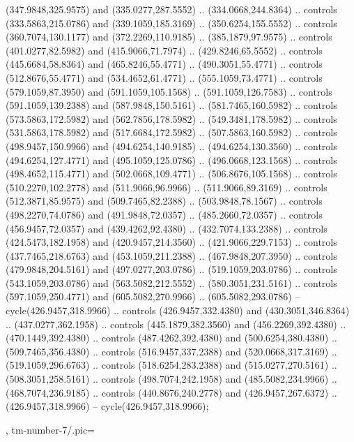 {{\begin{scope}[y=-0.80pt,x=0.80pt,scale=0.04,yshift=188pt,xshift=-380pt]
      (347.9848,325.9575) and (335.0277,287.5552) .. (334.0668,244.8364) .. controls
      (333.5863,215.0786) and (339.1059,185.3169) .. (350.6254,155.5552) .. controls
      (360.7074,130.1177) and (372.2269,110.9185) .. (385.1879,97.9575) .. controls
      (401.0277,82.5982) and (415.9066,71.7974) .. (429.8246,65.5552) .. controls
      (445.6684,58.8364) and (465.8246,55.4771) .. (490.3051,55.4771) .. controls
      (512.8676,55.4771) and (534.4652,61.4771) .. (555.1059,73.4771) .. controls
      (579.1059,87.3950) and (591.1059,105.1568) .. (591.1059,126.7583) .. controls
      (591.1059,139.2388) and (587.9848,150.5161) .. (581.7465,160.5982) .. controls
      (573.5863,172.5982) and (562.7856,178.5982) .. (549.3481,178.5982) .. controls
      (531.5863,178.5982) and (517.6684,172.5982) .. (507.5863,160.5982) .. controls
      (498.9457,150.9966) and (494.6254,140.9185) .. (494.6254,130.3560) .. controls
      (494.6254,127.4771) and (495.1059,125.0786) .. (496.0668,123.1568) .. controls
      (498.4652,115.4771) and (502.0668,109.4771) .. (506.8676,105.1568) .. controls
      (510.2270,102.2778) and (511.9066,96.9966) .. (511.9066,89.3169) .. controls
      (512.3871,85.9575) and (509.7465,82.2388) .. (503.9848,78.1567) .. controls
      (498.2270,74.0786) and (491.9848,72.0357) .. (485.2660,72.0357) .. controls
      (456.9457,72.0357) and (439.4262,92.4380) .. (432.7074,133.2388) .. controls
      (424.5473,182.1958) and (420.9457,214.3560) .. (421.9066,229.7153) .. controls
      (437.7465,218.6763) and (453.1059,211.2388) .. (467.9848,207.3950) .. controls
      (479.9848,204.5161) and (497.0277,203.0786) .. (519.1059,203.0786) .. controls
      (543.1059,203.0786) and (563.5082,212.5552) .. (580.3051,231.5161) .. controls
      (597.1059,250.4771) and (605.5082,270.9966) .. (605.5082,293.0786) --
      cycle(426.9457,318.9966) .. controls (426.9457,332.4380) and
      (430.3051,346.8364) .. (437.0277,362.1958) .. controls (445.1879,382.3560) and
      (456.2269,392.4380) .. (470.1449,392.4380) .. controls (487.4262,392.4380) and
      (500.6254,380.4380) .. (509.7465,356.4380) .. controls (516.9457,337.2388) and
      (520.0668,317.3169) .. (519.1059,296.6763) .. controls (518.6254,283.2388) and
      (515.0277,270.5161) .. (508.3051,258.5161) .. controls (498.7074,242.1958) and
      (485.5082,234.9966) .. (468.7074,236.9185) .. controls (440.8676,240.2778) and
      (426.9457,267.6372) .. (426.9457,318.9966) -- cycle(426.9457,318.9966);
    \end{scope}
  },
  tm-number-7/.pic={
    \begin{scope}[y=-0.80pt,x=0.80pt,scale=0.04,yshift=232pt,xshift=-368pt]

\end{scope}}}
